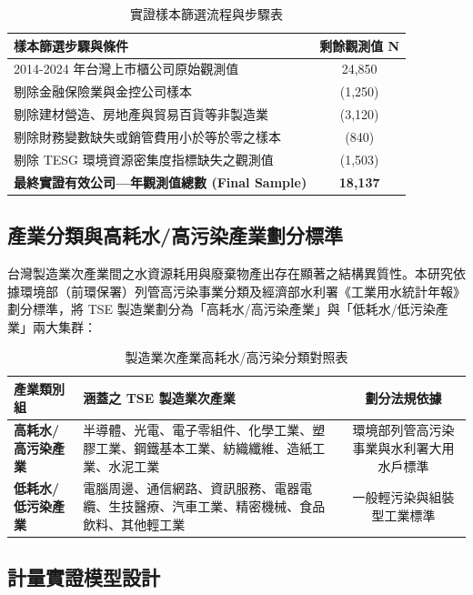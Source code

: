 \documentclass[12pt,a4paper]{article}
\begin{document}
\begin{table}[H]
\centering
\caption{實證樣本篩選流程與步驟表}
\label{tab:sample_selection}
\small
\begin{tabular}{lc}
\toprule
樣本篩選步驟與條件 & 剩餘觀測值 N \\
\midrule
2014-2024 年台灣上市櫃公司原始觀測值 & 24,850 \\
剔除金融保險業與金控公司樣本 & (1,250) \\
剔除建材營造、房地產與貿易百貨等非製造業 & (3,120) \\
剔除財務變數缺失或銷管費用小於等於零之樣本 & (840) \\
剔除 TESG 環境資源密集度指標缺失之觀測值 & (1,503) \\
\midrule
\textbf{最終實證有效公司—年觀測值總數 (Final Sample)} & \textbf{18,137} \\
\bottomrule
\end{tabular}
\end{table}

\subsection{產業分類與高耗水/高污染產業劃分標準}

台灣製造業次產業間之水資源耗用與廢棄物產出存在顯著之結構異質性。本研究依據環境部（前環保署）列管高污染事業分類及經濟部水利署《工業用水統計年報》劃分標準，將 TSE 製造業劃分為「高耗水/高污染產業」與「低耗水/低污染產業」兩大集群：

\begin{table}[H]
\centering
\caption{製造業次產業高耗水/高污染分類對照表}
\label{tab:industry_class}
\small
\begin{tabular}{lp{7.5cm}c}
\toprule
產業類別組 & 涵蓋之 TSE 製造業次產業 & 劃分法規依據 \\
\midrule
\textbf{高耗水/高污染產業} & 半導體、光電、電子零組件、化學工業、塑膠工業、鋼鐵基本工業、紡織纖維、造紙工業、水泥工業 & 環境部列管高污染事業與水利署大用水戶標準 \\
\textbf{低耗水/低污染產業} & 電腦周邊、通信網路、資訊服務、電器電纜、生技醫療、汽車工業、精密機械、食品飲料、其他輕工業 & 一般輕污染與組裝型工業標準 \\
\bottomrule
\end{tabular}
\end{table}

\subsection{計量實證模型設計}
\end{document}
